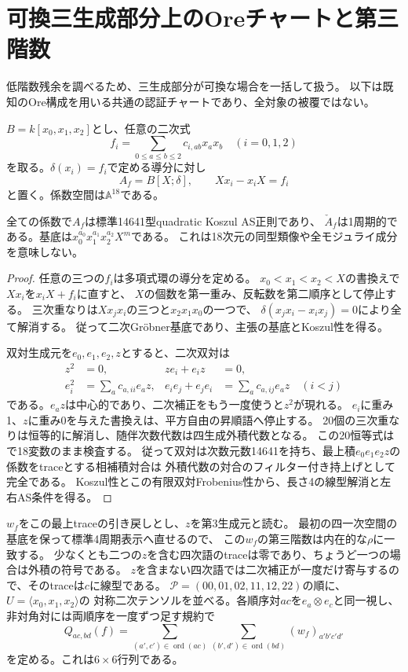 \section{可換三生成部分上のOreチャートと第三階数}
\label{sec:polynomial-ore}
低階数残余を調べるため、三生成部分が可換な場合を一括して扱う。
以下は既知のOre構成を用いる共通の認証チャートであり、全対象の被覆ではない。

$B=k[x_0,x_1,x_2]$とし、任意の二次式
\[
 f_i=\sum_{0\leq a\leq b\leq2}c_{i,ab}x_ax_b\quad(i=0,1,2)
\]
を取る。$\delta(x_i)=f_i$で定める導分に対し
\[
 A_f=B[X;\delta],\qquad Xx_i-x_iX=f_i
\]
と置く。係数空間は$\mathbb A^{18}$である。

\begin{theorem}[全ファイバー正則な多項式Oreチャート]\label{thm:polynomial-ore-regular}
全ての係数で$A_f$は標準14641型quadratic Koszul AS正則であり、
$\check A_f$は1周期的である。基底は$x_0^{a_0}x_1^{a_1}x_2^{a_2}X^m$である。
これは18次元の同型類像や全モジュライ成分を意味しない。
\end{theorem}
\begin{proof}
任意の三つの$f_i$は多項式環の導分を定める。
$x_0<x_1<x_2<X$の書換えで$Xx_i$を$x_iX+f_i$に直すと、
$X$の個数を第一重み、反転数を第二順序として停止する。
三次重なりは$Xx_jx_i$の三つと$x_2x_1x_0$の一つで、
$\delta(x_jx_i-x_ix_j)=0$により全て解消する。
従って二次Gr\"obner基底であり、主張の基底とKoszul性を得る。

双対生成元を$e_0,e_1,e_2,z$とすると、二次双対は
\begin{align*}
 z^2&=0,& ze_i+e_iz&=0,\\
 e_i^2&=\sum_a c_{a,ii}e_az,&
 e_ie_j+e_je_i&=\sum_a c_{a,ij}e_az\quad(i<j)
\end{align*}
である。$e_a z$は中心的であり、二次補正をもう一度使うと$z^2$が現れる。
$e_i$に重み1、$z$に重み0を与えた書換えは、平方自由の昇順語へ停止する。
20個の三次重なりは恒等的に解消し、随伴次数代数は四生成外積代数となる。
この20恒等式はで18変数のまま検査する。
従って双対は次数元数14641を持ち、最上積$e_0e_1e_2z$の係数をtraceとする相補積対合は
外積代数の対合のフィルター付き持上げとして完全である。
Koszul性とこの有限双対Frobenius性から、長さ4の線型解消と左右AS条件を得る。
\end{proof}

$w_f$をこの最上traceの引き戻しとし、$z$を第3生成元と読む。
最初の四一次空間の基底を保って標準4周期表示へ直せるので、
この$w_f$の第三階数は内在的な$\rho$に一致する。
少なくとも二つの$z$を含む四次語のtraceは零であり、ちょうど一つの場合は外積の符号である。
$z$を含まない四次語では二次補正が一度だけ寄与するので、そのtraceは$c$に線型である。
$\mathcal P=(00,01,02,11,12,22)$の順に、$U=\langle x_0,x_1,x_2\rangle$の
対称二次テンソルを並べる。各順序対$ac$を$e_a\otimes e_c$と同一視し、
非対角対には両順序を一度ずつ足す規約で
\[
 Q_{ac,bd}(f)=\sum_{(a',c')\in\operatorname{ord}(ac)}
              \sum_{(b',d')\in\operatorname{ord}(bd)}
              (w_f)_{a'b'c'd'}
\]
を定める。これは$6\times6$行列である。

